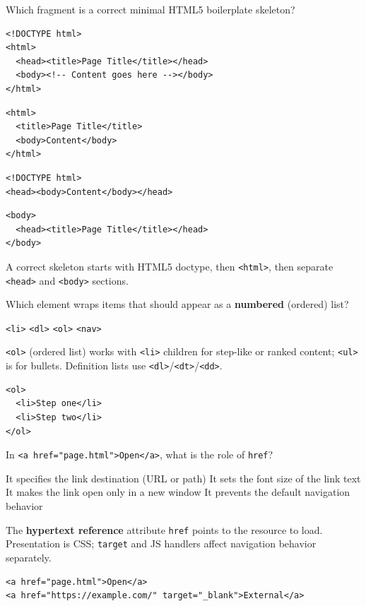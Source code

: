 \question[4]
Which fragment is a correct minimal HTML5 boilerplate skeleton?
\begin{choices}
  \CorrectChoice
\begin{lstlisting}[style=htmlexam]
<!DOCTYPE html>
<html>
  <head><title>Page Title</title></head>
  <body><!-- Content goes here --></body>
</html>
\end{lstlisting}
  \choice
\begin{lstlisting}[style=htmlexam]
<html>
  <title>Page Title</title>
  <body>Content</body>
</html>
\end{lstlisting}
  \choice
\begin{lstlisting}[style=htmlexam]
<!DOCTYPE html>
<head><body>Content</body></head>
\end{lstlisting}
  \choice
\begin{lstlisting}[style=htmlexam]
<body>
  <head><title>Page Title</title></head>
</body>
\end{lstlisting}
\end{choices}
\begin{solution}
  A correct skeleton starts with HTML5 doctype, then \texttt{<html>}, then separate \texttt{<head>} and \texttt{<body>} sections.
\end{solution}


\newpage

\question[4]
Which element wraps items that should appear as a \textbf{numbered} (ordered) list?
\begin{choices}
  \choice \texttt{<li>}
  \choice \texttt{<dl>}
  \CorrectChoice \texttt{<ol>}
  \choice \texttt{<nav>}
\end{choices}
\begin{solution}
  \texttt{<ol>} (ordered list) works with \texttt{<li>} children for step-like or ranked content; \texttt{<ul>} is for bullets. Definition lists use \texttt{<dl>}/\texttt{<dt>}/\texttt{<dd>}.
\begin{lstlisting}[style=htmlexam]
<ol>
  <li>Step one</li>
  <li>Step two</li>
</ol>
\end{lstlisting}
\end{solution}

\question[4]
In \texttt{<a href="page.html">Open</a>}, what is the role of \texttt{href}?
\begin{choices}
  \CorrectChoice It specifies the link destination (URL or path)
  \choice It sets the font size of the link text
  \choice It makes the link open only in a new window
  \choice It prevents the default navigation behavior
\end{choices}
\begin{solution}
  The \textbf{hypertext reference} attribute \texttt{href} points to the resource to load. Presentation is CSS; \texttt{target} and JS handlers affect navigation behavior separately.
\begin{lstlisting}[style=htmlexam]
<a href="page.html">Open</a>
<a href="https://example.com/" target="_blank">External</a>
\end{lstlisting}
\end{solution}

